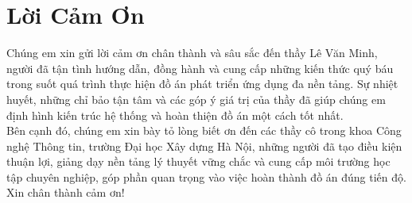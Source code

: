 \documentclass[12pt,a4paper]{report}
\begin{document}
\chapter*{Lời Cảm Ơn}
Chúng em xin gửi lời cảm ơn chân thành và sâu sắc đến thầy Lê Văn Minh, người đã tận tình hướng dẫn, đồng hành và cung cấp những kiến thức quý báu trong suốt quá trình thực hiện đồ án phát triển ứng dụng đa nền tảng. Sự nhiệt huyết, những chỉ bảo tận tâm và các góp ý giá trị của thầy đã giúp chúng em định hình kiến trúc hệ thống và hoàn thiện đồ án một cách tốt nhất. \\[1cm]
Bên cạnh đó, chúng em xin bày tỏ lòng biết ơn đến các thầy cô trong khoa Công nghệ Thông tin, trường Đại học Xây dựng Hà Nội, những người đã tạo điều kiện thuận lợi, giảng dạy nền tảng lý thuyết vững chắc và cung cấp môi trường học tập chuyên nghiệp, góp phần quan trọng vào việc hoàn thành đồ án đúng tiến độ. \\[1cm]
Xin chân thành cảm ơn!

\newpage

\tableofcontents
\newpage
\listoffigures
{}
\newpage

\end{document}
